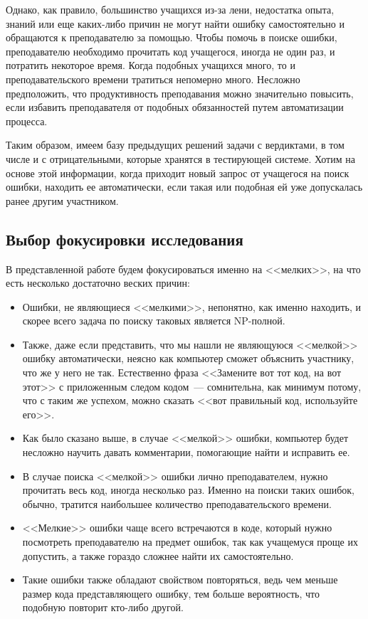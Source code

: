 Однако, как правило, большинство учащихся из-за лени, недостатка опыта, знаний или еще каких-либо причин не могут найти ошибку
самостоятельно и обращаются к преподавателю за помощью. Чтобы помочь в поиске ошибки, преподавателю необходимо прочитать код учащегося,
иногда не один раз, и потратить некоторое время. Когда подобных учащихся много, то и преподавательского времени тратиться 
непомерно много. Несложно предположить, что продуктивность преподавания можно значительно повысить, если избавить преподавателя от 
подобных обязанностей путем автоматизации процесса.

Таким образом, имеем базу предыдущих решений задачи с вердиктами, в том числе и с отрицательными, которые хранятся в 
тестирующей системе. Хотим на основе этой информации, когда приходит новый запрос от учащегося на поиск ошибки, 
находить ее автоматически, если такая или подобная ей уже допускалась ранее другим участником. 

\subsection{Выбор фокусировки исследования}
В представленной работе будем фокусироваться именно на <<мелких>>, на что есть несколько достаточно веских причин:
\begin{itemize}
    \item Ошибки, не являющиеся <<мелкими>>, непонятно, как именно находить, и скорее всего задача по поиску таковых
        является NP-полной.
    \item Также, даже если представить, что мы нашли не являющуюся <<мелкой>> ошибку автоматически, неясно как
        компьютер сможет объяснить участнику, что же у него не так. Естественно фраза <<Замените вот тот код, на вот этот>>
        с приложенным следом кодом~--- сомнительна, как минимум потому, что с таким же успехом, можно сказать <<вот правильный
        код, используйте его>>.
    \item Как было сказано выше, в случае <<мелкой>> ошибки, компьютер будет несложно научить давать комментарии, помогающие
        найти и исправить ее. 
    \item В случае поиска <<мелкой>> ошибки лично преподавателем, нужно прочитать
        весь код, иногда несколько раз. Именно на поиски таких ошибок, обычно, тратится наибольшее количество
        преподавательского времени.
    \item <<Мелкие>> ошибки чаще всего встречаются в коде, который нужно посмотреть преподавателю на предмет ошибок, 
        так как учащемуся проще их допустить, а также гораздо сложнее найти их самостоятельно.
    \item Такие ошибки также обладают свойством повторяться, ведь чем меньше размер кода представляющего ошибку, 
        тем больше вероятность, что подобную повторит кто-либо другой.
\end{itemize}

